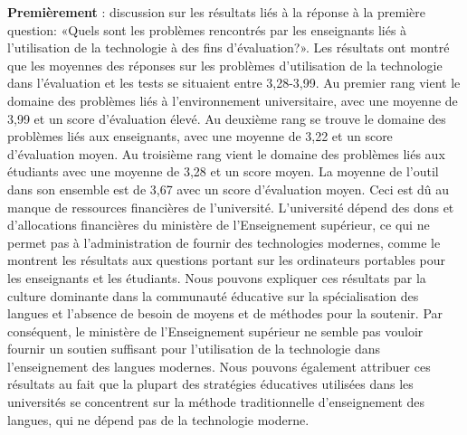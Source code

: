\documentclass[french]{textolivre}
\begin{document}
\textbf{Premièrement} : discussion sur les résultats liés à la réponse à la première question: «Quels sont les problèmes rencontrés par les enseignants liés à l'utilisation de la technologie à des fins d'évaluation?». Les résultats ont montré que les moyennes des réponses sur les problèmes d'utilisation de la technologie dans l'évaluation et les tests se situaient entre 3,28-3,99. Au premier rang vient le domaine des problèmes liés à l'environnement universitaire, avec une moyenne de 3,99 et un score d'évaluation élevé. Au deuxième rang se trouve le domaine des problèmes liés aux enseignants, avec une moyenne de 3,22 et un score d'évaluation moyen. Au troisième rang vient le domaine des problèmes liés aux étudiants avec une moyenne de 3,28 et un score moyen. La moyenne de l'outil dans son ensemble est de 3,67 avec un score d'évaluation moyen. Ceci est dû au manque de ressources financières de l'université. L'université dépend des dons et d’allocations financières du ministère de l'Enseignement supérieur, ce qui ne permet pas à l'administration de fournir des technologies modernes, comme le montrent les résultats aux questions portant sur les ordinateurs portables pour les enseignants et les étudiants. Nous pouvons expliquer ces résultats par la culture dominante dans la communauté éducative sur la spécialisation des langues et l'absence de besoin de moyens et de méthodes pour la soutenir. Par conséquent, le ministère de l'Enseignement supérieur ne semble pas vouloir fournir un soutien suffisant pour l'utilisation de la technologie dans l'enseignement des langues modernes. Nous pouvons également attribuer ces résultats au fait que la plupart des stratégies éducatives utilisées dans les universités se concentrent sur la méthode traditionnelle d'enseignement des langues, qui ne dépend pas de la technologie moderne.
\end{document}
